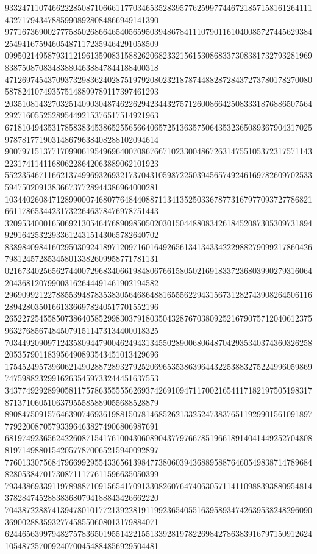 \begin{DoxyCode}
      933247110746622285087106661177034653528395776259977446721857158161264111432717943478859908928084866949141390
      977167369002777585026866465405659503948678411107901161040085727445629384254941675946054871172359464291058509
      099502149587931121961359083158826206823321561530868337308381732793281969838750870834838804638847844188400318
      471269745437093732983624028751979208023218787448828728437273780178270080587824107493575148899789117397461293
      203510814327032514090304874622629423443275712600866425083331876886507564292716055252895449215376517514921963
      671810494353178583834538652556566406572513635750643532365089367904317025978781771903148679638408288102094614
      900797151377170990619549696400708676671023300486726314755105372317571143223174114116806228642063889062101923
      552235467116621374996932693217370431059872250394565749246169782609702533594750209138366737728944386964000281
      103440260847128990007468077648440887113413525033678773167977093727786821661178653442317322646378476978751443
      320953400016506921305464768909850502030150448808342618452087305309731894929164253229336124315143065782640702
      838984098416029503092418971209716016492656134134334222988279099217860426798124572853458013382609958771781131
      021673402565627440072968340661984806766158050216918337236803990279316064204368120799003162644491461902194582
      296909921227885539487835383056468648816555622943156731282743908264506116289428035016613366978240517701552196
      265227254558507386405852998303791803504328767038092521679075712040612375963276856748450791511473134400018325
      703449209097124358094479004624943134550289006806487042935340374360326258205357901183956490893543451013429696
      175452495739606214902887289327925206965353863964432253883275224996059869747598823299162635459733244451637553
      343774929289905811757863555556269374269109471170021654117182197505198317871371060510637955585889055688528879
      890847509157646390746936198815078146852621332524738376511929901561091897779220087057933964638274906806987691
      681974923656242260871541761004306089043779766785196618914041449252704808819714988015420577870065215940092897
      776013307568479669929554336561398477380603943688958876460549838714789684828053847017308711177611596635050399
      793438693391197898871091565417091330826076474063057114110988393880954814378284745288383680794188843426662220
      704387228874139478010177213922819119923654055163958934742639538248296090369002883593277458550608013179884071
      624465639979482757836501955142215513392819782269842786383916797150912624105487257009240700454884856929504481

\end{DoxyCode}
